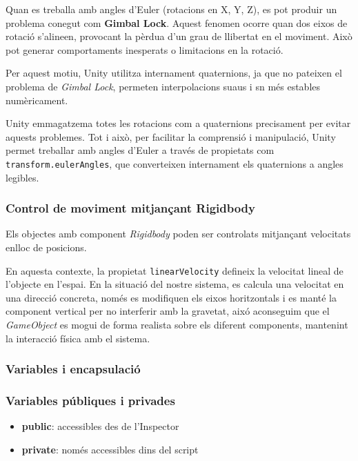 \documentclass[a4paper,11pt,DIV=13,headings=normal,abstract=true,twoside=semi]{article}
\begin{document}
Quan es treballa amb angles d'Euler (rotacions en X, Y, Z), es pot produir un problema conegut com \textbf{Gimbal Lock}. Aquest fenomen ocorre quan dos eixos de rotació s'alineen, provocant la pèrdua d'un grau de llibertat en el moviment. Això pot generar comportaments inesperats o limitacions en la rotació. 

Per aquest motiu, Unity utilitza internament quaternions, ja que no pateixen el problema de \textit{Gimbal Lock}, permeten interpolacions suaus i sn més estables numèricament.

Unity emmagatzema totes les rotacions com a quaternions precisament per evitar aquests problemes. Tot i això, per facilitar la comprensió i manipulació, Unity permet treballar amb angles d'Euler \cite{UnityQuaternionEuler2019} a través de propietats com \texttt{transform.eulerAngles}, que converteixen internament els quaternions a angles legibles. 



\subsubsection{Control de moviment mitjançant Rigidbody}

Els objectes amb component \textit{Rigidbody} \cite{UnityRigidbody} poden ser controlats mitjançant velocitats enlloc de posicions.

En aquesta contexte, la propietat \texttt{linearVelocity} defineix la velocitat lineal de l'objecte en l'espai. En la situació del nostre sistema, es calcula una velocitat en una direcció concreta, només es modifiquen els eixos horitzontals i es manté la component vertical per no interferir amb la gravetat, aixó aconseguim que el \textit{GameObject} es mogui de forma realista sobre els diferent components, mantenint la interacció física amb el sistema.


\subsubsection{Variables i encapsulació}

\subsubsection*{Variables públiques i privades}

\begin{itemize}
\item \textbf{public}: accessibles des de l'Inspector \cite{MicrosoftFields}
\item \textbf{private}: només accessibles dins del script
\end{itemize}
\end{document}
